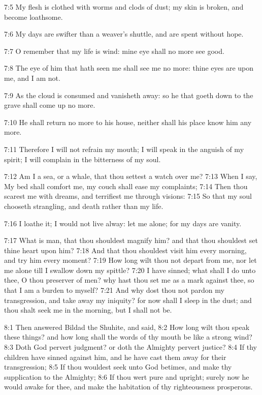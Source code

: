 7:5 My flesh is clothed with worms and clods of dust; my skin is
broken, and become loathsome.

7:6 My days are swifter than a weaver's shuttle, and are spent without
hope.

7:7 O remember that my life is wind: mine eye shall no more see good.

7:8 The eye of him that hath seen me shall see me no more: thine eyes
are upon me, and I am not.

7:9 As the cloud is consumed and vanisheth away: so he that goeth down
to the grave shall come up no more.

7:10 He shall return no more to his house, neither shall his place
know him any more.

7:11 Therefore I will not refrain my mouth; I will speak in the
anguish of my spirit; I will complain in the bitterness of my soul.

7:12 Am I a sea, or a whale, that thou settest a watch over me?  7:13
When I say, My bed shall comfort me, my couch shall ease my
complaints; 7:14 Then thou scarest me with dreams, and terrifiest me
through visions: 7:15 So that my soul chooseth strangling, and death
rather than my life.

7:16 I loathe it; I would not live alway: let me alone; for my days
are vanity.

7:17 What is man, that thou shouldest magnify him? and that thou
shouldest set thine heart upon him?  7:18 And that thou shouldest
visit him every morning, and try him every moment?  7:19 How long wilt
thou not depart from me, nor let me alone till I swallow down my
spittle?  7:20 I have sinned; what shall I do unto thee, O thou
preserver of men?  why hast thou set me as a mark against thee, so
that I am a burden to myself?  7:21 And why dost thou not pardon my
transgression, and take away my iniquity? for now shall I sleep in the
dust; and thou shalt seek me in the morning, but I shall not be.

8:1 Then answered Bildad the Shuhite, and said, 8:2 How long wilt thou
speak these things? and how long shall the words of thy mouth be like
a strong wind?  8:3 Doth God pervert judgment? or doth the Almighty
pervert justice?  8:4 If thy children have sinned against him, and he
have cast them away for their transgression; 8:5 If thou wouldest seek
unto God betimes, and make thy supplication to the Almighty; 8:6 If
thou wert pure and upright; surely now he would awake for thee, and
make the habitation of thy righteousness prosperous.

